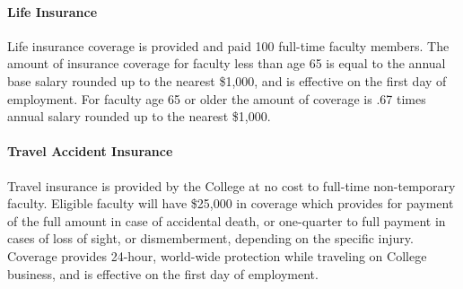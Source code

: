 \documentclass[letterpaper, 11pt]{article}
\begin{document}
			\paragraph{Life Insurance}
				Life insurance coverage is provided and paid 100%
				full-time faculty members.  The amount of insurance coverage for faculty less
				than age 65 is equal to the annual base salary rounded up to the nearest
				\$1,000, and is effective on the first day of employment.  For faculty age 65
				or older the amount of coverage is .67 times annual salary rounded up to the
				nearest \$1,000.
			\paragraph{Travel Accident Insurance}
				Travel insurance is provided by the College at no cost to full-time
				non-temporary faculty.  Eligible faculty will have \$25,000 in coverage which provides for payment of the full amount in case of accidental death, or one-quarter to full payment in cases of loss of sight, or dismemberment, depending on the specific injury.  Coverage provides 24-hour, world-wide protection while traveling on College business, and is effective on the first day of employment.
\end{document}
